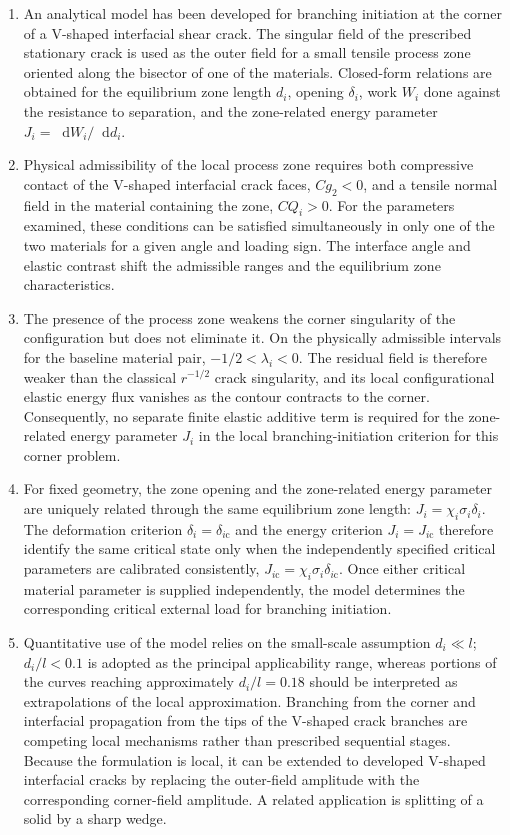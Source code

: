 \documentclass[pdflatex,onecolumn,sn-mathphys-ay]{sn-jnl}
\newcommand{\dd}{\mathop{}\!\mathrm{d}}
\begin{document}
\begin{enumerate}
\item
An analytical model has been developed for branching initiation at the
corner of a V-shaped interfacial shear crack. The singular field of the
prescribed stationary crack is used as the outer field for a small tensile
process zone oriented along the bisector of one of the materials.
Closed-form relations are obtained for the equilibrium zone length $d_i$,
opening $\delta_i$, work $W_i$ done against the resistance to separation,
and the zone-related energy parameter $J_i=\dd W_i/\dd d_i$.

\item
Physical admissibility of the local process zone requires both compressive
contact of the V-shaped interfacial crack faces, $Cg_2<0$, and a tensile
normal field in the material containing the zone, $CQ_i>0$. For the
parameters examined, these conditions can be satisfied simultaneously in
only one of the two materials for a given angle and loading sign. The
interface angle and elastic contrast shift the admissible ranges and the
equilibrium zone characteristics.

\item
The presence of the process zone weakens the corner singularity of the
configuration but does not eliminate it. On the physically admissible intervals for the baseline
material pair, $-1/2<\lambda_i<0$. The residual field is therefore weaker
than the classical $r^{-1/2}$ crack singularity, and its local
configurational elastic energy flux vanishes as the contour contracts to
the corner. Consequently, no separate finite elastic additive term is required for the
zone-related energy parameter $J_i$ in the local branching-initiation
criterion for this corner problem.

\item
For fixed geometry, the zone opening and the zone-related energy parameter
are uniquely related through the same equilibrium zone length:
$J_i=\chi_i\sigma_i\delta_i$. The deformation criterion
$\delta_i=\delta_{i\mathrm{c}}$ and the energy criterion
$J_i=J_{i\mathrm{c}}$ therefore identify the same critical state only
when the independently specified critical parameters are calibrated
consistently,
$J_{i\mathrm{c}}=\chi_i\sigma_i\delta_{i\mathrm{c}}$. Once either
critical material parameter is supplied independently, the model determines
the corresponding critical external load for branching initiation.

\item
Quantitative use of the model relies on the small-scale assumption
$d_i\ll l$; $d_i/l<0.1$ is adopted as the principal applicability range,
whereas portions of the curves reaching approximately $d_i/l=0.18$ should
be interpreted as extrapolations of the local approximation. Branching
from the corner and interfacial propagation from the tips of the V-shaped crack
branches are competing local mechanisms rather than prescribed
sequential stages. Because the formulation is local, it can be extended
to developed V-shaped interfacial cracks by replacing the outer-field
amplitude with the corresponding corner-field amplitude. A related
application is splitting of a solid by a sharp wedge.
\end{enumerate}
\end{document}
